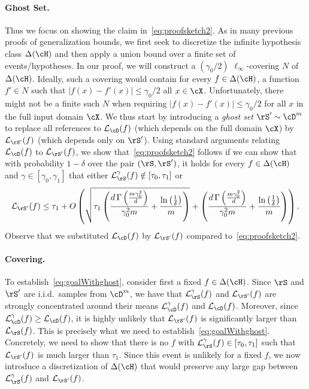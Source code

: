 \paragraph{Ghost Set.}
Thus we focus on showing the claim in~\cref{eq:proofsketch2}. As in many previous proofs of generalization bounds, we first seek to discretize the infinite hypothesis class $\dlh$ and then apply a union bound over a finite set of events/hypotheses. In our proof, we will construct a $(\gamma_0/2)$ $\ell_\infty$-covering $N$ of $\dlh$. Ideally, such a covering would contain for every $f \in \dlh$, a function $f' \in N$ such that $|f(x)-f'(x)| \leq \gamma_0/2$ all $x \in \cX$. Unfortunately, there might not be a finite such $N$ when requiring $|f(x)-f'(x)| \leq \gamma_0/2$ for all $x$ in the full input domain $\cX$. We thus start by introducing a \emph{ghost set} $\rS' \sim \cD^m$ to replace all references to $\ls_{\cD}(f)$ (which depends on the full domain $\cX$) by $\ls_{\rS'}(f)$ (which depends only on $\rS'$). Using standard arguments relating $\ls_{\cD}(f)$ to $\ls_{\rS'}(f)$, we show that~\cref{eq:proofsketch2} follows if we can show that with probability $1-\delta$ over the pair $(\rS,\rS')$, it holds for every $f \in \dlh$ and $\gamma \in [\gamma_0,\gamma_1]$ that either $\ls_{\rS}^\gamma(f) \notin [\tau_0, \tau_1]$ or
\begin{align}\label{eq:goalWithghost}
 \ls_{\rS'}(f)\leq \tau_{1}+O\left(\sqrt{\tau_{1}\left(\frac{d\func{\left(\frac{m \gamma_{0}^{2}}{d} \right)}}{\gamma_{0}^{2}m}+\frac{\ln{\left(\frac{1}{\delta}\right)}}{m} \right)}+\left(\frac{d\func{\left(\frac{m\gamma_{0}^{2}}{d} \right)}}{\gamma_{0}^{2}m}+\frac{\ln{\left(\frac{1}{\delta}\right)}}{m} \right) \right).
\end{align}
Observe that we substituted $\ls_{\cD}(f)$ by $\ls_{\rS'}(f)$ compared to~\cref{eq:proofsketch2}.

\paragraph{Covering.}
To establish~\cref{eq:goalWithghost}, consider first a fixed $ f\in \dlh $. Since $\rS$ and $\rS'$ are i.i.d.\ samples from $\cD^m$, we have that $\ls^\gamma_{\rS}(f)$ and $\ls_{\rS'}(f)$ are strongly concentrated around their means $\ls^\gamma_\cD(f)$ and $\ls_\cD(f)$. Moreover, since $\ls^\gamma_\cD(f) \geq \ls_\cD(f)$, it is highly unlikely that $\ls_{\rS'}(f)$ is significantly larger than $\ls_\rS(f)$. This is precisely what we need to establish~\cref{eq:goalWithghost}. Concretely, we need to show that there is no $f$ with $\ls^\gamma_\rS(f) \in [\tau_0, \tau_1]$ such that $\ls_{\rS'}(f)$ is much larger than $\tau_1$. Since this event is unlikely for a fixed $f$, we now introduce a discretization of $\dlh$ that would preserve any large gap between $\ls^\gamma_\rS(f)$ and $\ls_{\rS'}(f)$.

